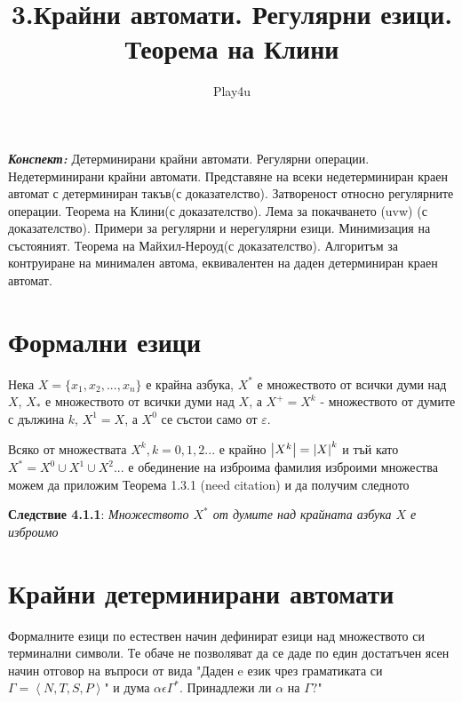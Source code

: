 \documentclass[11pt]{article} %
\title{3.Крайни автомати. Регулярни езици. Теорема на Клини}
\author{Play4u}
\begin{document}
\maketitle

\textbf{\textit{Конспект:}} Детерминирани крайни автомати. Регулярни операции. Недетерминирани крайни автомати. Представяне на всеки недетерминиран краен автомат с детерминиран такъв(с доказателство). Затвореност относно регулярните операции. Теорема на Клини(с доказателство). Лема за покачването (uvw) (с доказателство). Примери за регулярни и нерегулярни езици. Минимизация на състояният. Теорема на Майхил-Нероуд(с доказателство). Алгоритъм за контруиране на минимален автома, еквивалентен на даден детерминиран краен автомат.

\newcommand{\lrangle}[1]{\left\langle #1 \right\rangle}

\newcommand{\belongsTo}{\in}
\newcommand{\notBelongsTo}{\centernot\in}
\newcommand{\kda}{A = <Q, X, q_{0}, \delta, F>}

\newcommand{\italicBold}[1]{\textbf{\emph{#1}}}
\newcommand{\definition}{\italicBold{Дефиниция:}}
\newcommand{\theorem}{\italicBold{Теорема:}}
\newcommand{\lemma}{\italicBold{Лема:}}
\newcommand{\proof}{\italicBold{Доказателство:}}

\newcommand{\curlies}[1]{\{#1\}}

\section{Формални езици}

Нека $X = \{x_1, x_2, ..., x_n\}$ е крайна азбука, $X^*$ е множеството от всички думи над $X$, $X_{*}$ е множеството от всички думи над $X$, а $X^{+} = X^{k}$ 
- множеството от думите с дължина 
$k$, $X^{1} = X$, а $X^{0}$ 
се състои само от $\varepsilon$. \par

Всяко от множествата $X^{k}, k = 0, 1, 2 ...$ е крайно $\abs{X^{k}} = \abs{X}^{k}$ и тъй като $X^{*} = X^{0} \cup X^{1} \cup X^{2}...$ е обединение на изброима фамилия изброими множества можем да приложим Теорема 1.3.1 (need citation) и да получим следното \par

\textbf{Следствие 4.1.1}: \emph{Множеството $X^{*}$ от думите над крайната азбука $X$ е изброимо} \par
   

\section{Крайни детерминирани автомати}
Формалните езици по естествен начин дефинират езици над множеството си терминални символи. Те обаче не позволяват да се даде по един достатъчен ясен начин отговор на въпроси от вида "Даден e език чрез граматиката си $\Gamma = \left\langle N, T, S, P \right\rangle$"
и дума $\alpha \epsilon \Gamma^*.$ Принадлежи ли $\alpha$ на $\Gamma?$" \par
\end{document}
